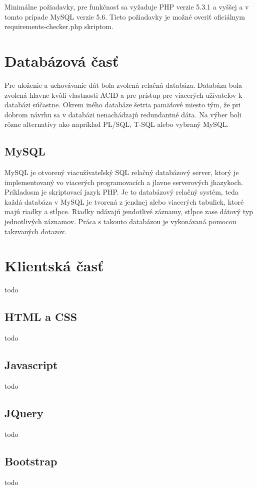 Minimálne požiadavky, pre funkčnosť sa vyžaduje PHP verzie 5.3.1 a vyššej a v tomto prípade MySQL verzie 5.6. Tieto požiadavky je možné overiť oficiálnym requirements-checker.php skriptom.


\section{Databázová časť}
Pre uloženie a uchovávanie dát bola zvolená relačná databáza. Databáza bola zvolená hlavne kvôli vlastnosti ACID a pre prístup pre viacerých užívateľov k databázi súčastne. Okrem iného databáze šetria pamäťové miesto tým, že pri dobrom návrhu sa v databázi nenachádzajú redundantné dáta. Na výber boli rôzne alternatívy ako napríklad PL/SQL, T-SQL alebo vybraný MySQL.  

\subsection{MySQL}
MySQL je otvorený viacužívateľský SQL relačný databázový server, ktorý je implementovaný vo viacerých programovacích a jlavne serverových jhazykoch. Príkladosm je skriptovací jazyk PHP. Je to databázový relačný systém, teda každá databáza v MySQL je tvorená z jendnej alebo viacerých tabuliek, ktoré majú riadky a stĺpce. Riadky udávajú jendotlivé záznamy, stĺpce zase dátový typ jednotlivých záznamov. Práca s takouto databázou je vykonávaná pomocou takzvaných dotazov.

\section{Klientská časť}
todo

\subsection{HTML a CSS}
todo

\subsection{Javascript}
todo

\subsection{JQuery}
todo

\subsection{Bootstrap}
todo

